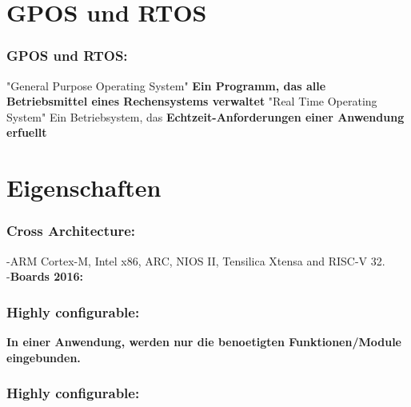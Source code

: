 \documentclass{beamer}
\begin{document}
\section{GPOS und RTOS } %


\begin{frame}
\frametitle{GPOS und RTOS:}
"General Purpose Operating System"\linebreak 
\textbf{Ein Programm, das alle Betriebsmittel eines Rechensystems verwaltet}\linebreak 
\linebreak"Real  Time Operating System"\linebreak 
Ein Betriebsystem, das  \textbf{Echtzeit-Anforderungen einer Anwendung erfuellt\\}

\end{frame}








\section{Eigenschaften}
\begin{frame}
\frametitle{Cross Architecture: }
-ARM Cortex-M, Intel x86, ARC, NIOS II, Tensilica Xtensa and RISC-V 32.\\
-\textbf{Boards 2016:}\\

\end{frame}

\begin{frame}
\frametitle{Highly configurable:}
\textbf{In einer Anwendung, werden nur die benoetigten Funktionen/Module eingebunden.}\\
\end{frame}
\begin{frame}
\frametitle{Highly configurable:}
\end{frame}
\end{document}
